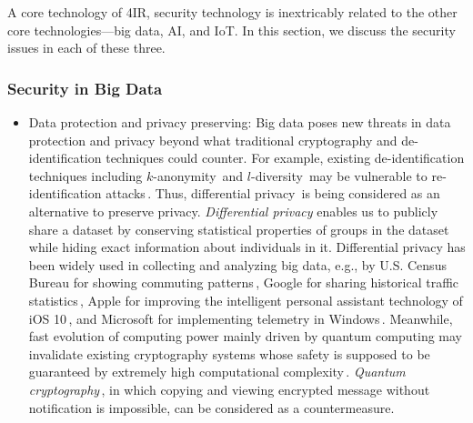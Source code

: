 \documentclass[11pt]{article}
\begin{document}
A core technology of 4IR, security technology is inextricably related to the other core technologies---big data, AI, and IoT. In this section, we discuss the security issues in each of these three. 

\subsubsection{Security in Big Data}

\begin{itemize}
  \item Data protection and privacy preserving: 
  Big data poses new threats in data protection and privacy beyond what traditional cryptography and de-identification techniques could counter. For example,
  existing de-identification techniques including $k$-anonymity\,\cite{Sweeney2013} and $l$-diversity\,\cite{Machanavajjhala2006} may be vulnerable to re-identification attacks\,\cite{Henriksen-Bulmer2016}. Thus, differential privacy\,\cite{Cynthia2014} is being considered as an alternative to preserve privacy. \emph{Differential privacy} enables us to publicly share a dataset by conserving statistical properties of groups in the dataset while hiding exact information about individuals in it. Differential privacy has been widely used in collecting and analyzing big data, e.g., by U.S. Census Bureau for showing commuting patterns\,\cite{Ashwin2008}, Google for sharing historical traffic statistics\,\cite{Google2015}, Apple for improving the intelligent personal assistant technology of iOS 10\,\cite{Apple2016}, and Microsoft for implementing telemetry in Windows\,\cite{Bolin2017}. 
  Meanwhile, fast evolution of computing power mainly driven by quantum computing may invalidate existing cryptography systems whose safety is supposed to be guaranteed by extremely high computational complexity\,\cite{bernstein2009introduction}. \emph{Quantum cryptography}\,\cite{Nicolas2002}, in which copying and viewing encrypted message without notification is impossible, can be considered as a countermeasure.


\end{itemize}
\end{document}
